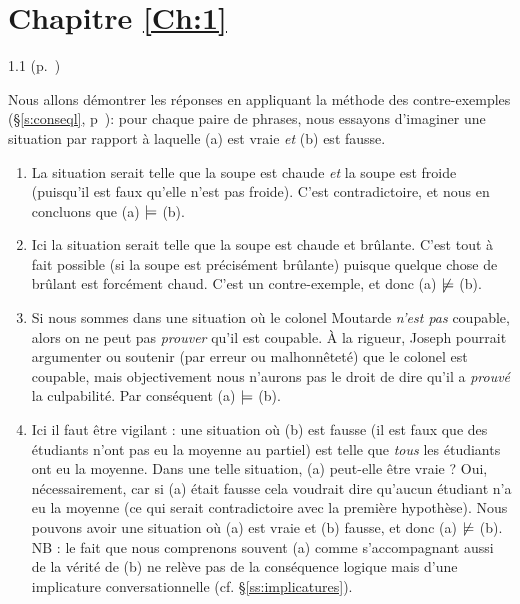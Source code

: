 \protect \section {Chapitre \protect \ref {Ch:1}}
\begin{Solution}{1.{1}}
(p.~\pageref{exo:1CL})\label{crg:1CL}

\sloppy

Nous allons démontrer les réponses en appliquant la méthode des contre-exemples (\S\ref{s:conseql}, p~\pageref{p.contrex}):  pour chaque paire de phrases, nous essayons d'imaginer une situation par rapport à laquelle (a) est vraie \emph{et} (b) est fausse.

\fussy
\begin{enumerate}
\item
La situation serait telle que la soupe est chaude \emph{et} la soupe est froide (puisqu'il est faux qu'elle n'est pas froide). C'est contradictoire, et nous en concluons que (a) $\mathrel|\mathrel{\mkern -3.5mu}=$ (b).
\item
Ici la situation serait telle que la soupe est chaude et brûlante. C'est tout à fait possible (si la soupe est précisément brûlante) puisque quelque chose de brûlant est forcément chaud. C'est un contre-exemple, et donc (a) $\not\mathrel|\mathrel{\mkern -3.5mu}=$ (b).
\item
Si nous sommes dans une situation où le colonel Moutarde \emph{n'est pas} coupable, alors on ne peut pas \emph{prouver} qu'il est coupable. À la rigueur, Joseph pourrait argumenter ou soutenir (par erreur ou malhonnêteté) que le colonel est coupable, mais objectivement nous n'aurons pas le droit de dire qu'il a \emph{prouvé} la culpabilité.  Par conséquent (a) $\mathrel|\mathrel{\mkern -3.5mu}=$ (b).
\item
Ici il faut être vigilant : une situation où (b) est fausse  (il est faux que des étudiants n'ont pas eu la moyenne au partiel) est telle que \emph{tous} les étudiants ont eu la moyenne.  Dans une telle situation, (a) peut-elle être vraie ? Oui, nécessairement, car si (a) était fausse cela voudrait dire qu'aucun étudiant n'a eu la moyenne (ce qui serait contradictoire avec la première hypothèse).  Nous pouvons avoir une situation où (a) est vraie et (b) fausse, et donc (a) $\not\mathrel|\mathrel{\mkern -3.5mu}=$ (b).
\\
NB : le fait que nous comprenons souvent (a) comme s'accompagnant aussi de la vérité de (b) ne relève pas de la conséquence logique mais d'une implicature conversationnelle (cf. \S\ref{ss:implicatures}).
\end{enumerate}
\end{Solution}
